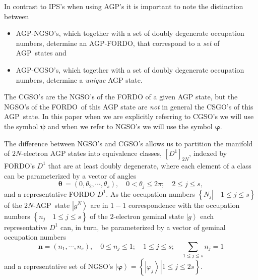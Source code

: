 \documentclass[aps,preprint]{revtex4}%
\begin{document}
In contrast to IPS's when using AGP's it is important to note the distinction between

\begin{itemize}
\item AGP-NGSO's, which together with a set of doubly degenerate occupation
numbers, determine an AGP-FORDO, that correspond to a \emph{set }of
AGP\ states and

\item AGP-CGSO's, which together with a set of doubly degenerate occupation
numbers, determine a \emph{unique} AGP state.
\end{itemize}

The CGSO's are the NGSO's of the FORDO of a given AGP state, but the NGSO's of
the FORDO\ of this AGP state are \emph{not }in general the CSGO's of this
AGP\ state. In this paper when we are explicitly referring to CGSO's we will
use the symbol $\mathbf{\psi}$ and when we refer to NGSO's we will use the
symbol $\mathbf{\varphi.}$

The difference between NGSO's and CGSO's allows us to partition the manifold
of $2N$-electron AGP states into equivalence classes, $\left[  D^{1}\right]
_{2N}$, indexed by FORDO's $D^{1}$ that are at least doubly degenerate, where
each element of a class can be parameterized by a vector of angles
\begin{equation}
\mathbf{\theta\,}=\left(  0,\theta_{2},\cdots,\theta_{s}\right)
,\quad0<\theta_{j}\leq2\pi;\quad2\leq j\leq s,
\end{equation}
and a representative FORDO $D^{1}.$ As the occupation numbers $\left\{
\left.  N_{j}\right\vert \quad1\leq j\leq s\right\}  $ of the $2N$-AGP\ state
$\left\vert g^{N}\right\rangle $ are in $1-1$ correspondence \cite{Colemann}
with the occupation numbers $\left\{  n_{j}\quad1\leq j\leq s\right\}  $ of
the $2$-electron geminal state $\left\vert g\right\rangle $ each
representative $D^{1}$ can, in turn, be parameterized by a vector of geminal
occupation numbers%
\begin{equation}
\mathbf{n}=\left(  n_{1},\cdots,n_{s}\right)  ,\quad0\leq n_{j}\leq
1;\quad1\leq j\leq s;\quad%
{\textstyle\sum\limits_{1\leq j\leq s}}
n_{j}=1
\end{equation}
and a representative set of NGSO's $\left\vert \mathbf{\varphi}\right\rangle
=\left\{  \left.  \left\vert \varphi_{j}\right\rangle \right\vert 1\leq
j\leq2s\right\}  $.
\end{document}
